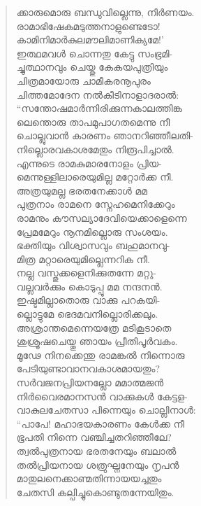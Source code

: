 \begin{verse}
ക്കാരുമൊരു ബന്ധുവില്ലെന്നു, നിര്‍ണയം.\\
രാമാഭിഷേകമടുത്തനാളുണ്ടെടോ!\\
കാമിനിമാര്‍കുലമൗലിമാണിക്യമേ!’\\
ഇത്ഥമവള്‍ ചൊന്നതു കേട്ടു സംഭ്രമി-\\
ച്ചുത്ഥാനവും ചെയ്തു കേകയപുത്രിയും\\
ചിത്രമായോരു ചാമീകരനൂപുരം\\
ചിത്തമോദേന നല്‍കീടിനാളാദരാല്‍:\\
“സന്തോഷമാര്‍ന്നിരിക്കുന്നകാലത്തിങ്ക\\
ലെന്തൊരു താപമുപാഗതമെന്നു നീ\\
ചൊല്ലുവാന്‍ കാരണം ഞാനറിഞ്ഞീലതി-\\
നില്ലൊരവകാശമേതും നിരൂപിച്ചാല്‍.\\
എന്നുടെ രാമകുമാരനോളം പ്രിയ-\\
മെന്നുള്ളിലാരെയുമില്ല മറ്റോര്‍ക്ക നീ.\\
അത്രയുമല്ല ഭരതനേക്കാള്‍ മമ\\
പുത്രനാം രാമനെ സ്നേഹമെനിക്കേറും\\
രാമനും കൗസല്യാദേവിയെക്കാളെന്നെ\\
പ്രേമമേറും നൂനമില്ലൊരു സംശയം.\\
ഭക്തിയും വിശ്വാസവും ബഹുമാനവു-\\
മിത്ര മറ്റാരെയുമില്ലെന്നറിക നീ.\\
നല്ല വസ്തുക്കളെനിക്കുതന്നേ മറ്റു-\\
വല്ലവര്‍ക്കും കൊടുപ്പൂ മമ നന്ദനന്‍.\\
ഇഷ്ടമില്ലാതൊരു വാക്കു പറകയി-\\
ല്ലൊട്ടുമേ ഭെദമവനില്ലൊരിക്കലും.\\
അശ്രാന്തമെന്നെയത്രേ മടികൂടാതെ\\
ശുശ്രൂഷചെയ്തു ഞായം പ്രീതിപൂര്‍വകം.\\
മൂഢേ നിനക്കെന്തു രാമങ്കല്‍ നിന്നൊരു\\
പേടിയുണ്ടാവാനവകാശമായതും?\\
സര്‍വജനപ്രിയനല്ലോ മമാത്മജന്‍\\
നിര്‍വൈരമാനസന്‍ വാക്കുകള്‍ കേട്ടള-\\
വാകുലചേതസാ പിന്നെയും ചൊല്ലിനാള്‍:\\
“പാപേ! മഹാഭയകാരണം കേള്‍ക്ക നീ\\
ഭൂപതി നിന്നെ വഞ്ചിച്ചതറിഞ്ഞീലേ?\\
ത്വല്‍പുത്രനായ ഭരതനേയും ബലാല്‍\\
തല്‍പ്രിയനായ ശത്രുഘ്നനേയും നൃപന്‍\\
മാതുലനെക്കാണ്മതിന്നായയച്ചതും\\
ചേതസി കല്പിച്ചുകൊണ്ടുതന്നേയിതും.\\

\end{verse}
